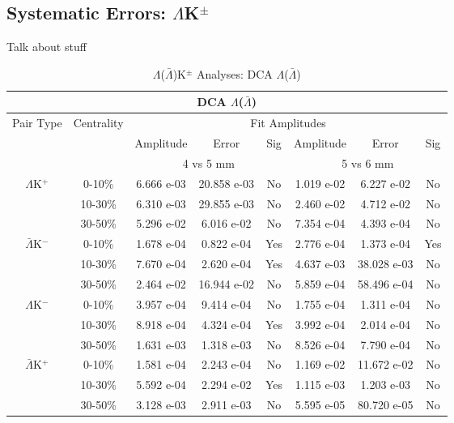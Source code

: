 \documentclass[../AnalysisNoteJBuxton.tex]{subfiles}
\begin{document}
\subsection{Systematic Errors: \texorpdfstring{$\Lambda$K$^{\pm}$}{TEXT}}
\label{SysErrsLamKch}

Talk about stuff


\begin{table}
 \centering
 \begin{tabular}{|c|c|c|c|c||c|c|c|}
  \multicolumn{8}{c}{DCA $\Lambda$($\bar{\Lambda}$)} \\
  \hline
  \multirow{3}{*}{Pair Type} & \multirow{3}{*}{Centrality} & \multicolumn{6}{c|}{Fit Amplitudes} \\
  \cline{3-8}
   & & Amplitude & Error & Sig & Amplitude & Error & Sig \\  
  \cline{3-8}
   & & \multicolumn{3}{c||}{4 vs 5 mm} & \multicolumn{3}{c|}{5 vs 6 mm} \\  
  \hline
  \multirow{3}{*}{$\Lambda$K$^{+}$}
   &  0-10\% & 6.666 e-03 & 20.858 e-03 & No & 1.019 e-02 & 6.227 e-02 & No \\
   & 10-30\% & 6.310 e-03 & 29.855 e-03 & No & 2.460 e-02 & 4.712 e-02 & No \\
   & 30-50\% & 5.296 e-02 & 6.016 e-02 & No & 7.354 e-04 & 4.393 e-04 & No \\
  \hline
  \multirow{3}{*}{$\bar{\Lambda}$K$^{-}$}
   &  0-10\% & 1.678 e-04 & 0.822 e-04 & Yes & 2.776 e-04 & 1.373 e-04 & Yes \\
   & 10-30\% & 7.670 e-04 & 2.620 e-04 & Yes & 4.637 e-03 & 38.028 e-03 & No \\
   & 30-50\% & 2.464 e-02 & 16.944 e-02 & No & 5.859 e-04 & 58.496 e-04 & No \\
  \hline \hline
  \multirow{3}{*}{$\Lambda$K$^{-}$}
   &  0-10\% & 3.957 e-04 & 9.414 e-04 & No & 1.755 e-04 & 1.311 e-04 & No \\
   & 10-30\% & 8.918 e-04 & 4.324 e-04 & Yes & 3.992 e-04 & 2.014 e-04 & No \\
   & 30-50\% & 1.631 e-03 & 1.318 e-03 & No & 8.526 e-04 & 7.790 e-04 & No \\
  \hline
  \multirow{3}{*}{$\bar{\Lambda}$K$^{+}$}
   &  0-10\% & 1.581 e-04 & 2.243 e-04 & No & 1.169 e-02 & 11.672 e-02 & No \\
   & 10-30\% & 5.592 e-04 & 2.294 e-02 & Yes & 1.115 e-03 & 1.203 e-03 & No \\
   & 30-50\% & 3.128 e-03 & 2.911 e-03 & No & 5.595 e-05 & 80.720 e-05 & No \\
  \hline
 \end{tabular}
 \caption{$\Lambda$($\bar{\Lambda}$)K$^{\pm}$ Analyses: DCA $\Lambda$($\bar{\Lambda}$)}
 \label{tab:V0DcaLamKch}
\end{table}
\end{document}
